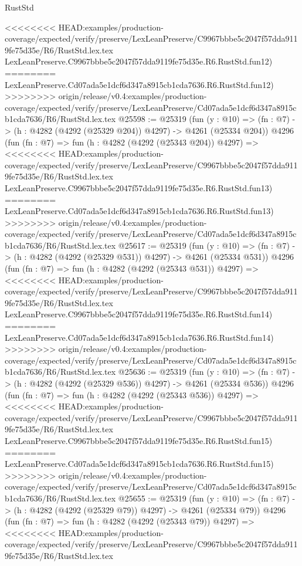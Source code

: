 \begin{lexlean}{RustStd}
\begin{coremodule}
{\begin{coremodule}
{{{{{{{{{{{{{{{{{{{{{{{{{{{{{{{{{{{<<<<<<<< HEAD:examples/production-coverage/expected/verify/preserve/LexLeanPreserve/C9967bbbe5c2047f57dda9119fe75d35e/R6/RustStd.lex.tex
    LexLeanPreserve.C9967bbbe5c2047f57dda9119fe75d35e.R6.RustStd.fun12)
========
    LexLeanPreserve.Cd07ada5e1dcf6d347a8915cb1cda7636.R6.RustStd.fun12)
>>>>>>>> origin/release/v0.4:examples/production-coverage/expected/verify/preserve/LexLeanPreserve/Cd07ada5e1dcf6d347a8915cb1cda7636/R6/RustStd.lex.tex
@25598 := @25319
    (fun (y : @10) => (fn : @7) -> (h : @4282 (@4292 (@25329 @204)) @4297) -> @4261 (@25334 @204))
    @4296
    (fun (fn : @7) =>
    fun (h : @4282 (@4292 (@25343 @204)) @4297) =>
<<<<<<<< HEAD:examples/production-coverage/expected/verify/preserve/LexLeanPreserve/C9967bbbe5c2047f57dda9119fe75d35e/R6/RustStd.lex.tex
    LexLeanPreserve.C9967bbbe5c2047f57dda9119fe75d35e.R6.RustStd.fun13)
========
    LexLeanPreserve.Cd07ada5e1dcf6d347a8915cb1cda7636.R6.RustStd.fun13)
>>>>>>>> origin/release/v0.4:examples/production-coverage/expected/verify/preserve/LexLeanPreserve/Cd07ada5e1dcf6d347a8915cb1cda7636/R6/RustStd.lex.tex
@25617 := @25319
    (fun (y : @10) => (fn : @7) -> (h : @4282 (@4292 (@25329 @531)) @4297) -> @4261 (@25334 @531))
    @4296
    (fun (fn : @7) =>
    fun (h : @4282 (@4292 (@25343 @531)) @4297) =>
<<<<<<<< HEAD:examples/production-coverage/expected/verify/preserve/LexLeanPreserve/C9967bbbe5c2047f57dda9119fe75d35e/R6/RustStd.lex.tex
    LexLeanPreserve.C9967bbbe5c2047f57dda9119fe75d35e.R6.RustStd.fun14)
========
    LexLeanPreserve.Cd07ada5e1dcf6d347a8915cb1cda7636.R6.RustStd.fun14)
>>>>>>>> origin/release/v0.4:examples/production-coverage/expected/verify/preserve/LexLeanPreserve/Cd07ada5e1dcf6d347a8915cb1cda7636/R6/RustStd.lex.tex
@25636 := @25319
    (fun (y : @10) => (fn : @7) -> (h : @4282 (@4292 (@25329 @536)) @4297) -> @4261 (@25334 @536))
    @4296
    (fun (fn : @7) =>
    fun (h : @4282 (@4292 (@25343 @536)) @4297) =>
<<<<<<<< HEAD:examples/production-coverage/expected/verify/preserve/LexLeanPreserve/C9967bbbe5c2047f57dda9119fe75d35e/R6/RustStd.lex.tex
    LexLeanPreserve.C9967bbbe5c2047f57dda9119fe75d35e.R6.RustStd.fun15)
========
    LexLeanPreserve.Cd07ada5e1dcf6d347a8915cb1cda7636.R6.RustStd.fun15)
>>>>>>>> origin/release/v0.4:examples/production-coverage/expected/verify/preserve/LexLeanPreserve/Cd07ada5e1dcf6d347a8915cb1cda7636/R6/RustStd.lex.tex
@25655 := @25319
    (fun (y : @10) => (fn : @7) -> (h : @4282 (@4292 (@25329 @79)) @4297) -> @4261 (@25334 @79))
    @4296
    (fun (fn : @7) =>
    fun (h : @4282 (@4292 (@25343 @79)) @4297) =>
<<<<<<<< HEAD:examples/production-coverage/expected/verify/preserve/LexLeanPreserve/C9967bbbe5c2047f57dda9119fe75d35e/R6/RustStd.lex.tex
}}}}}}}}}}}}}}}}}}}}}}}}}}}}}}}}}}}
\end{coremodule}}
\end{coremodule}
\end{lexlean}
